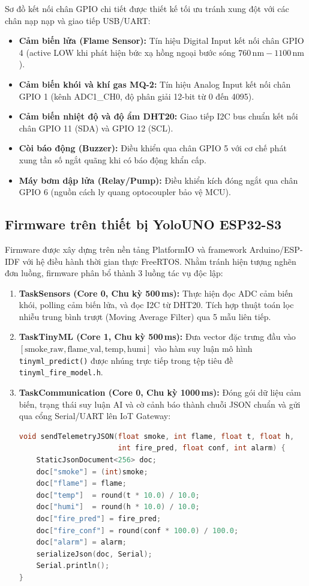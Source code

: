 Sơ đồ kết nối chân GPIO chi tiết được thiết kế tối ưu tránh xung đột với các chân nạp nạp và giao tiếp USB/UART:
\begin{itemize}
    \item \textbf{Cảm biến lửa (Flame Sensor):} Tín hiệu Digital Input kết nối chân GPIO 4 (active LOW khi phát hiện bức xạ hồng ngoại bước sóng $760\,\text{nm} - 1100\,\text{nm}$).
    \item \textbf{Cảm biến khói và khí gas MQ-2:} Tín hiệu Analog Input kết nối chân GPIO 1 (kênh ADC1\_CH0, độ phân giải 12-bit từ 0 đến 4095).
    \item \textbf{Cảm biến nhiệt độ và độ ẩm DHT20:} Giao tiếp I2C bus chuẩn kết nối chân GPIO 11 (SDA) và GPIO 12 (SCL).
    \item \textbf{Còi báo động (Buzzer):} Điều khiển qua chân GPIO 5 với cơ chế phát xung tần số ngắt quãng khi có báo động khẩn cấp.
    \item \textbf{Máy bơm dập lửa (Relay/Pump):} Điều khiển kích đóng ngắt qua chân GPIO 6 (nguồn cách ly quang optocoupler bảo vệ MCU).
\end{itemize}

\subsection{Firmware trên thiết bị YoloUNO ESP32-S3}
Firmware được xây dựng trên nền tảng PlatformIO và framework Arduino/ESP-IDF với hệ điều hành thời gian thực FreeRTOS. Nhằm tránh hiện tượng nghẽn đơn luồng, firmware phân bổ thành 3 luồng tác vụ độc lập:
\begin{enumerate}
    \item \textbf{TaskSensors (Core 0, Chu kỳ 500\,ms):} Thực hiện đọc ADC cảm biến khói, polling cảm biến lửa, và đọc I2C từ DHT20. Tích hợp thuật toán lọc nhiễu trung bình trượt (Moving Average Filter) qua 5 mẫu liên tiếp.
    \item \textbf{TaskTinyML (Core 1, Chu kỳ 500\,ms):} Đưa vector đặc trưng đầu vào $[\text{smoke\_raw}, \text{flame\_val}, \text{temp}, \text{humi}]$ vào hàm suy luận mô hình \texttt{tinyml\_predict()} được nhúng trực tiếp trong tệp tiêu đề \texttt{tinyml\_fire\_model.h}.
    \item \textbf{TaskCommunication (Core 0, Chu kỳ 1000\,ms):} Đóng gói dữ liệu cảm biến, trạng thái suy luận AI và cờ cảnh báo thành chuỗi JSON chuẩn và gửi qua cổng Serial/UART lên IoT Gateway:
    \begin{lstlisting}[language=C, style=mystyle]
void sendTelemetryJSON(float smoke, int flame, float t, float h, 
                       int fire_pred, float conf, int alarm) {
    StaticJsonDocument<256> doc;
    doc["smoke"] = (int)smoke;
    doc["flame"] = flame;
    doc["temp"]  = round(t * 10.0) / 10.0;
    doc["humi"]  = round(h * 10.0) / 10.0;
    doc["fire_pred"] = fire_pred;
    doc["fire_conf"] = round(conf * 100.0) / 100.0;
    doc["alarm"] = alarm;
    serializeJson(doc, Serial);
    Serial.println();
}
    \end{lstlisting}
\end{enumerate}


